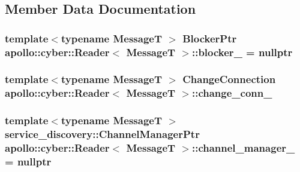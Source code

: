 \subsection{Member Data Documentation}
\hypertarget{classapollo_1_1cyber_1_1Reader_a67f9c4a80820313ff8e0cf8dcc733648}{
\subsubsection[{blocker\-\_\-}]{\setlength{\rightskip}{0pt plus 5cm}template$<$typename Message\-T $>$ {\bf Blocker\-Ptr} {\bf apollo\-::cyber\-::\-Reader}$<$ Message\-T $>$\-::blocker\-\_\- = nullptr\hspace{0.3cm}{\ttfamily [private]}}}\label{classapollo_1_1cyber_1_1Reader_a67f9c4a80820313ff8e0cf8dcc733648}
\hypertarget{classapollo_1_1cyber_1_1Reader_a2b2a5f2abea3a8c6c82b926f6ac5f5ff}{
\subsubsection[{change\-\_\-conn\-\_\-}]{\setlength{\rightskip}{0pt plus 5cm}template$<$typename Message\-T $>$ {\bf Change\-Connection} {\bf apollo\-::cyber\-::\-Reader}$<$ Message\-T $>$\-::change\-\_\-conn\-\_\-\hspace{0.3cm}{\ttfamily [private]}}}\label{classapollo_1_1cyber_1_1Reader_a2b2a5f2abea3a8c6c82b926f6ac5f5ff}
\hypertarget{classapollo_1_1cyber_1_1Reader_a5a7475f8ed5c996970a66d8c4338f8fd}{
\subsubsection[{channel\-\_\-manager\-\_\-}]{\setlength{\rightskip}{0pt plus 5cm}template$<$typename Message\-T $>$ {\bf service\-\_\-discovery\-::\-Channel\-Manager\-Ptr} {\bf apollo\-::cyber\-::\-Reader}$<$ Message\-T $>$\-::channel\-\_\-manager\-\_\- = nullptr\hspace{0.3cm}{\ttfamily [private]}}}\label{classapollo_1_1cyber_1_1Reader_a5a7475f8ed5c996970a66d8c4338f8fd}
